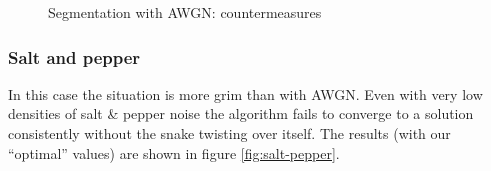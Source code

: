 \begin{figure}[!hbt]

\caption{Segmentation with AWGN: countermeasures}
\label{fig:awgn-countermeasures}
\end{figure}

\subsubsection{Salt and pepper}

In this case the situation is more grim than with AWGN. Even with very low densities of salt \& pepper noise the algorithm fails to converge to a solution consistently without the snake twisting over itself. The results (with our ``optimal'' values) are shown in figure \ref{fig:salt-pepper}.

